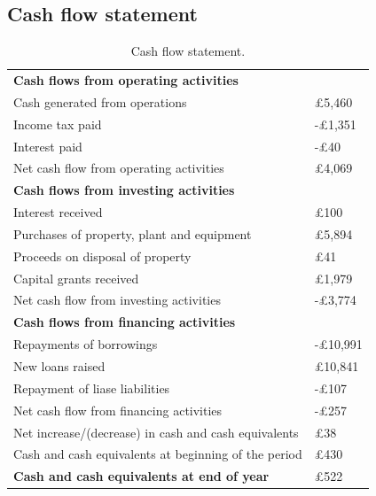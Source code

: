 \subsection{Cash flow statement}
\begin{table}[H]
    \centering
    \begin{tabular}{@{}ll@{}}
        \toprule
        \textbf{Cash flows from operating activities} & \\
        Cash generated from operations & \pounds 5,460\\
        Income tax paid & -\pounds 1,351\\
        Interest paid & -\pounds 40\\
        \midrule
        Net cash flow from operating activities & \pounds 4,069\\
        \midrule
        \textbf{Cash flows from investing activities} & \\
        Interest received & \pounds 100\\
        Purchases of property, plant and equipment & \pounds 5,894\\
        Proceeds on disposal of property & \pounds 41\\
        Capital grants received & \pounds 1,979\\
        \midrule
        Net cash flow from investing activities & -\pounds 3,774\\
        \midrule
        \textbf{Cash flows from financing activities} & \\
        Repayments of borrowings & -\pounds 10,991\\
        New loans raised & \pounds 10,841\\
        Repayment of liase liabilities & -\pounds 107\\
        \midrule
        Net cash flow from financing activities & -\pounds 257\\
        \midrule
        Net increase/(decrease) in cash and cash equivalents & \pounds 38\\
        Cash and cash equivalents at beginning of the period & \pounds 430\\
        \midrule
        \textbf{Cash and cash equivalents at end of year} & \pounds 522\\
        \bottomrule
    \end{tabular}
    \caption{Cash flow statement.}
\end{table}
